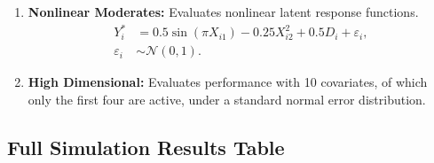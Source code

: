 \documentclass{article}
\numberwithin{figure}{section}
\numberwithin{table}{section}
\numberwithin{equation}{section}
\begin{document}
\begin{enumerate}
    \item \textbf{Nonlinear Moderates:} Evaluates nonlinear latent response functions.
    \begin{align*}
    Y_i^* &= 0.5 \sin(\pi X_{i1}) - 0.25 X_{i2}^2 + 0.5 D_i + \varepsilon_i, \\
    \varepsilon_i &\sim \mathcal{N}(0, 1).
    \end{align*}
    
    \item \textbf{High Dimensional:} Evaluates performance with 10 covariates, of which only the first four are active, under a standard normal error distribution.
\end{enumerate}

\subsection{Full Simulation Results Table}
\end{document}
